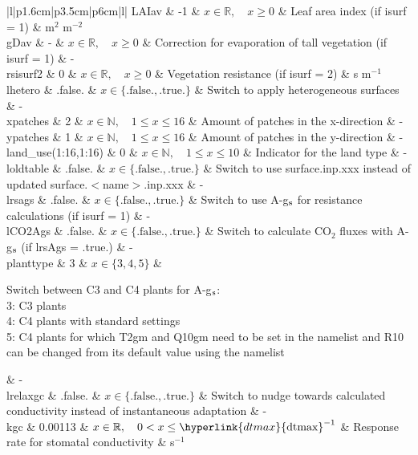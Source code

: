 \documentclass[twoside,11pt,fleqn,a4paper,english,openright]{report}
\begin{document}
\begin{center}
\begin{supertabular}{|l|p{1.6cm}|p{3.5cm}|p{6cm}|l|}
  LAIav	& -1	& $x \in \mathbb{R}, \quad x \ge 0$	& Leaf area index (if isurf = 1)	& m$^{2}$ m$^{-2}$\\
  gDav	& -	& $x \in \mathbb{R}, \quad x \ge 0$	& Correction for evaporation of tall vegetation (if isurf = 1) & -\\
  rsisurf2	& 0	& $x \in \mathbb{R}, \quad x \ge 0$	& Vegetation resistance (if isurf = 2)	& s m$^{-1}$\\
  lhetero & .false. & $x\in\{\text{.false.},\text{.true.}\}$ & Switch to apply heterogeneous surfaces & - \\
  xpatches & 2 & $x \in \mathbb{N}, \quad 1 \leq x \leq 16$ & Amount of patches in the x-direction & - \\
  ypatches & 1 & $x \in \mathbb{N}, \quad 1 \leq x \leq 16$ & Amount of patches in the y-direction & - \\
  land\_use(1:16,1:16) & 0 & $x \in \mathbb{N}, \quad 1 \leq x \leq 10$ & Indicator for the land type & - \\
  loldtable & .false. & $x\in\{\text{.false.},\text{.true.}\}$  & Switch to use surface.inp.xxx instead of updated surface.$<$name$>$.inp.xxx & - \\ 
  \hypertarget{lrsags}{lrsags}	& .false. & $x\in\{\text{.false.},\text{.true.}\}$  & Switch to use A-g$_{\rm s}$ for resistance calculations (if isurf = 1) & - \\ 
  lCO2Ags	& .false. & $x\in\{\text{.false.},\text{.true.}\}$  & Switch to calculate CO$_2$ fluxes with A-g$_{\rm s}$  (if lrsAgs = .true.) & - \\ 
  planttype     & 3 	& $x \in \{3, 4, 5\}$                   & \parbox{6cm}{Switch between C3 and C4 plants for A-g$_{\rm s}$: \\ 3: C3 plants \\ 4: C4 plants with standard settings \\ 5: C4 plants for which T2gm and Q10gm need to be set in the namelist and R10 can be changed from its default value using the namelist } & - \\
  lrelaxgc	& .false. & $x\in\{\text{.false.},\text{.true.}\}$  & Switch to nudge towards calculated conductivity instead of instantaneous adaptation & - \\ 
  kgc		& 0.00113 & $x \in \mathbb{R}, \quad 0 < x \le \hyperlink{dtmax}{\text{dtmax}}^{-1}$	& Response rate for stomatal conductivity	& s$^{-1}$\\

\end{supertabular}
\end{center}
\end{document}
